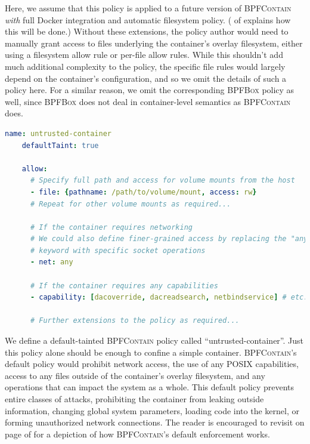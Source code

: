 \documentclass[
  fontsize=12pt,
  titlepage=firstiscover,
  paper=letter,
oneside,
  cleardoublepage=plain,
  parskip=half-,
  DIV=10,
  parindent,
  appendixprefix,
  chapterprefix,
  listof=totoc,
]{scrbook}
\newcommand{\bpfbox}{\textsc{BPFBox}}
\newcommand{\bpfcontain}{\textsc{BPFContain}}
\begin{document}
Here, we assume that this policy is applied to a future version of \bpfcontain{}
\textit{with} full Docker integration and automatic filesystem policy.
( of  explains how this will be
done.) Without these extensions, the policy author would need to manually grant access to
files underlying the container's overlay filesystem, either using a filesystem allow rule
or per-file allow rules. While this shouldn't add much additional complexity to the
policy, the specific file rules would largely depend on the container's configuration, and
so we omit the details of such a policy here. For a similar reason, we omit the
corresponding \bpfbox{} policy as well, since \bpfbox{} does not deal in container-level
semantics as \bpfcontain{} does.



\begin{lstlisting}[language=yaml, gobble=4,
  caption={[Confining an untrusted container with \bpfcontain{}]
    Confining an untrusted container with \bpfcontain{}.
    Note that this policy requires some extensions on top of the existing \bpfcontain{}
    model, such as instrumenting the Docker container runtime.
  },
  label={lst:bpfcontain-untrusted}, float=false]
    name: untrusted-container
    defaultTaint: true

    allow:
      # Specify full path and access for volume mounts from the host
      - file: {pathname: /path/to/volume/mount, access: rw}
      # Repeat for other volume mounts as required...

      # If the container requires networking
      # We could also define finer-grained access by replacing the "any"
      # keyword with specific socket operations
      - net: any

      # If the container requires any capabilities
      - capability: [dacoverride, dacreadsearch, netbindservice] # etc.

      # Further extensions to the policy as required...
\end{lstlisting}

We define a default-tainted \bpfcontain{} policy called \enquote{untrusted-container}.
Just this policy alone should be enough to confine a simple container. \bpfcontain{}'s
default policy would prohibit network access, the use of any POSIX capabilities, access to
any files outside of the container's overlay filesystem, and any operations that can
impact the system as a whole. This default policy prevents entire classes of attacks,
prohibiting the container from leaking outside information, changing global system
parameters, loading code into the kernel, or forming unauthorized network connections. The
reader is encouraged to revisit  on page
\pageref{fig:bpfcontain-enforcement} of  for a depiction of how
\bpfcontain{}'s default enforcement works.
\end{document}
